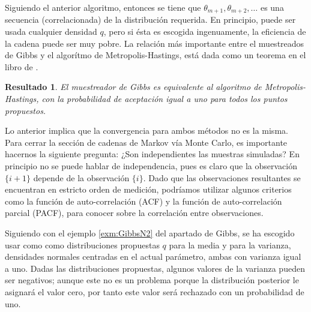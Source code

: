 \documentclass[
  10pt,
  spanish,
]{book}
\newtheorem{proposition}{Resultado}[chapter]
\theoremstyle{definition}
\theoremstyle{definition}
\theoremstyle{definition}
\theoremstyle{definition}
\theoremstyle{remark}
\begin{document}
Siguiendo el anterior algoritmo, entonces se tiene que \(\theta_{m+1}, \theta_{m+2}, \ldots\) es una secuencia (correlacionada) de la distribución requerida. En principio, puede ser usada cualquier densidad \(q\), pero si ésta es escogida ingenuamente, la eficiencia de la cadena puede ser muy pobre. La relación más importante entre el muestreados de Gibbs y el algorítmo de Metropolis-Hastings, está dada como un teorema en el libro de \citet[pág. 296]{Robert}.

\begin{proposition}
\protect\hypertarget{prp:unnamed-chunk-21}{}{\label{prp:unnamed-chunk-21} }El muestreador de Gibbs es equivalente al algoritmo de Metropolis-Hastings, con la
probabilidad de aceptación igual a uno para todos los puntos propuestos.
\end{proposition}

Lo anterior implica que la convergencia para ambos métodos no es la misma. Para cerrar la sección de cadenas de Markov vía Monte Carlo, es importante hacernos la siguiente pregunta: ¿Son independientes las muestras simuladas? En principio no se puede hablar de independencia, pues es claro que la observación \(\{i+1\}\) depende de la observación \(\{i\}\). Dado que las observaciones resultantes
se encuentran en estricto orden de medición, podríamos utilizar algunos criterios como la función de auto-correlación (ACF) y la función de auto-correlación parcial (PACF), para conocer sobre la correlación entre observaciones.

Siguiendo con el ejemplo \ref{exm:GibbsN2} del apartado de Gibbs, se ha escogido usar como como distribuciones propuestas \(q\) para la media y para la varianza, densidades normales centradas en el actual
parámetro, ambas con varianza igual a uno. Dadas las distribuciones propuestas, algunos valores de la varianza pueden ser negativos; aunque este no es un problema porque la distribución posterior le asignará el valor cero, por tanto este valor será rechazado con un probabilidad de uno.
\end{document}

